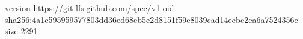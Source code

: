 version https://git-lfs.github.com/spec/v1
oid sha256:4a1c595959577803dd36ed68eb5e2d8151f59e8039cad14eebc2ea6a7524356e
size 2291
